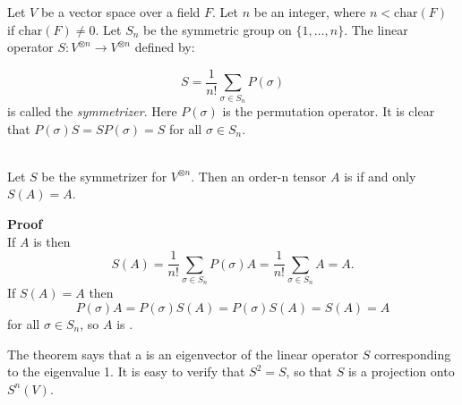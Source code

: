 \documentclass[12pt]{article}
\begin{document}
Let $V$ be a vector space over a field $F$. Let $n$ be an integer, where
$n < \mathrm{char}(F)$ if $\mathrm{char}(F) \neq 0$. Let $S_n$ be the symmetric group on
$\{1,\ldots, n\}.$
The linear operator $S: V^{\otimes n} \to V^{\otimes n}$ defined by:

$$
S = \frac{1}{n!} \sum_{\sigma \in S_n} P(\sigma)
$$
is called the \emph{symmetrizer}.
Here $P(\sigma)$ is the permutation operator.
It is clear that $P(\sigma )S = SP(\sigma )= S$ for all $\sigma \in S_n$.

\textbf{}\\
Let $S$ be the symmetrizer for $V^{\otimes n}$. Then an order-n tensor $A$ is 
 if and only $S(A) = A$.


\textbf{Proof}\\
If $A$ is   then 
$$
S(A) = \frac{1}{n!} \sum_{\sigma \in S_n} P(\sigma)A = \frac{1}{n!} \sum_{\sigma \in S_n} A = A.
$$
If $S(A) = A$ then 
$$
P(\sigma)A = P(\sigma)S(A) = P(\sigma)S(A) = S(A) = A
$$
for all $\sigma \in S_n$, so $A$ is  . 

The theorem says that a  is an eigenvector of the linear operator $S$ corresponding to the eigenvalue 1. It is easy to verify that
$S^2 = S$, so that $S$ is a projection onto $S^n(V)$.


\end{document}
